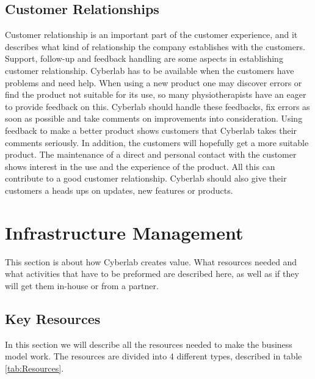 \subsection{Customer Relationships}
Customer relationship is an important part of the customer experience, and it describes what kind of relationship the company establishes with the customers. Support, follow-up and feedback handling are some aspects in establishing customer relationship. Cyberlab has to be available when the customers have problems and need help. When using a new product one may discover errors or find the product not suitable for its use, so many physiotherapists have an eager to provide feedback on this. Cyberlab should handle these feedbacks, fix errors as soon as possible and take comments on improvements into consideration. Using feedback to make a better product shows customers that Cyberlab takes their comments seriously.  In addition, the customers will hopefully get a more suitable product. The maintenance of a direct and personal contact with the customer shows interest in the use and the experience of the product. All this can contribute to a good customer relationship. Cyberlab should also give their customers a heads ups on updates, new features or products.
\section{Infrastructure Management}
This section is about how Cyberlab creates value. What resources needed and what activities that have to be preformed are described here, as well as if they will get them in-house or from a partner. 

\subsection{Key Resources}

In this section we will describe all the resources needed to make the business model work. The resources are divided into 4 different types, described in table \ref{tab:Resources}.
\newpage

